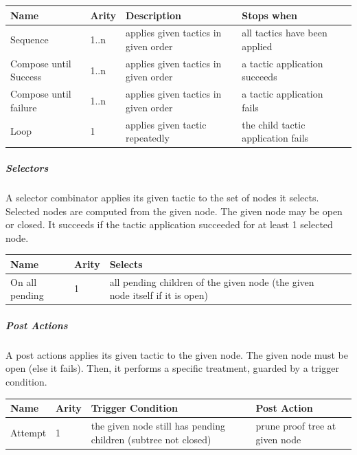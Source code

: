 \begin{center}
    \begin{tabular}{ | l | l | l | l | p{5cm} |}
    \hline
	Name & Arity & Description & Stops when  \\ \hline
	Sequence & 1..n  & applies given tactics in given order & all tactics have been applied  \\ \hline
	Compose until Success & 1..n  & applies given tactics in given order & a tactic application succeeds \\ \hline
	Compose until failure  & 1..n  & applies given tactics in given order & a tactic application fails \\ \hline
	Loop & 1 & applies given tactic repeatedly & the child tactic application fails \\ \hline
    \end{tabular}
\end{center}

\subparagraph{Selectors}

A selector combinator applies its given tactic to the set of nodes it selects. Selected nodes are computed from the given node. The given node may be open or closed. It succeeds if the tactic application succeeded for at least 1 selected node. 

\begin{center}
    \begin{tabular}{ | l | l | l | p{5cm} |}
    \hline
	Name & Arity & Selects \\ \hline
	On all pending  & 1 & all pending children of the given node (the given node itself if it is open) \\ \hline
    \end{tabular}
\end{center}

\subparagraph{Post Actions}

A post actions applies its given tactic to the given node. The given node must be open (else it fails). Then, it performs a specific treatment, guarded by a trigger condition. 

\begin{center}
    \begin{tabular}{ | l | l | l | l | p{5cm} |}
    \hline
	Name & Arity & Trigger Condition & Post Action \\ \hline
	Attempt & 1 & the given node still has pending children (subtree not closed) & prune proof tree at given node  \\ \hline
    \end{tabular}
\end{center}

